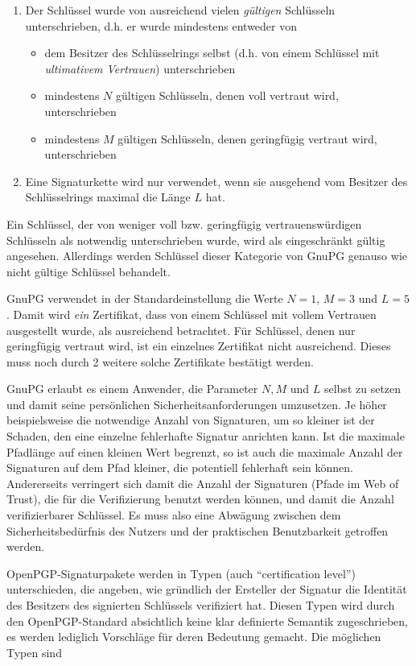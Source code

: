 \begin{enumerate}
\item Der Schlüssel wurde von ausreichend vielen \emph{gültigen} Schlüsseln
  unterschrieben, d.h. er wurde mindestens entweder von
  \begin{itemize}
  \item dem Besitzer des Schlüsselrings selbst (d.h. von einem
    Schlüssel mit \emph{ultimativem Vertrauen}) unterschrieben
  \item mindestens $N$ gültigen Schlüsseln, denen voll vertraut wird, unterschrieben
  \item mindestens $M$ gültigen Schlüsseln, denen geringfügig
    vertraut wird, unterschrieben
  \end{itemize}
\item Eine Signaturkette wird nur verwendet, wenn sie ausgehend vom
  Besitzer des Schlüsselrings maximal die Länge $L$ hat.
\end{enumerate}

Ein Schlüssel, der von weniger voll bzw. geringfügig
vertrauenswürdigen Schlüsseln als notwendig unterschrieben wurde, wird
als eingeschränkt gültig angesehen. Allerdings werden Schlüssel dieser
Kategorie von GnuPG genauso wie nicht gültige Schlüssel behandelt.

GnuPG verwendet in der Standardeinstellung die Werte $N=1$, $M=3$ und
$L=5$. Damit wird \emph{ein} Zertifikat, dass von einem Schlüssel
mit vollem Vertrauen ausgestellt wurde, als ausreichend
betrachtet. Für Schlüssel, denen nur geringfügig vertraut wird,
ist ein einzelnes Zertifikat nicht ausreichend. Dieses muss noch durch
2 weitere solche Zertifikate bestätigt werden. 

GnuPG erlaubt es einem Anwender, die Parameter $N, M$ und $L$ selbst
zu setzen und damit seine persönlichen Sicherheitsanforderungen
umzusetzen. Je höher beispielsweise die notwendige Anzahl von
Signaturen, um so kleiner ist der Schaden, den eine einzelne
fehlerhafte Signatur anrichten kann. Ist die maximale Pfadlänge auf
einen kleinen Wert begrenzt, so ist auch die maximale Anzahl der
Signaturen auf dem Pfad kleiner, die potentiell fehlerhaft sein
können. Andererseits verringert sich damit die Anzahl der Signaturen
(Pfade im Web of Trust), die für die Verifizierung benutzt werden
können, und damit die Anzahl verifizierbarer Schlüssel. Es muss also
eine Abwägung zwischen dem Sicherheitsbedürfnis des Nutzers und der
praktischen Benutzbarkeit getroffen werden.

OpenPGP-Signaturpakete werden in Typen (auch ``certification
level'') unterschieden, die angeben, wie gründlich der Ersteller der
Signatur die Identität des Besitzers des signierten Schlüssels
verifiziert hat. Diesen Typen wird durch den OpenPGP-Standard
absichtlich keine klar definierte Semantik zugeschrieben, es werden
lediglich Vorschläge für deren Bedeutung gemacht. Die möglichen
Typen sind

